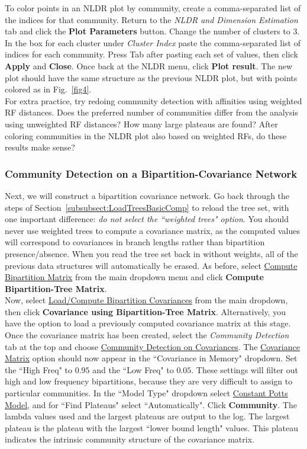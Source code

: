 \documentclass[11pt]{article}
\begin{document}
To color points in an NLDR plot by community, create a comma-separated list of the
indices for that community. Return to the {\it NLDR and Dimension Estimation} tab and click the
{\bf Plot Parameters} button. Change the number of clusters to $3$. In the box for each cluster
under {\it Cluster Index} paste the comma-separated list of indices for each community. Press Tab
after pasting each set of values, then click {\bf Apply} and {\bf Close}. Once back at the NLDR menu,
click {\bf Plot result}. The new plot should have the same structure as the previous NLDR plot,
but with points colored as in Fig.~\ref{fig4}. \\

For extra practice, try redoing community detection with affinities using weighted RF distances. Does the 
preferred number of communities differ from the analysis using unweighted RF distances? How many large
plateaus are found? After coloring communities in the NLDR plot also based on weighted RFs, do these results make sense?

\subsubsection{Community Detection on a Bipartition-Covariance Network}\label{subsubsect:CommunityDetectionBipartCovNetwork}

Next, we will construct a bipartition covariance network. Go back through the steps
of Section~\ref{subsubsect:LoadTreesBasicComp} to reload the tree set, with one important difference: {\it do not select the ``weighted trees" option}. You should never use weighted trees to compute a covariance matrix, as the computed values will correspond to covariances in branch lengths rather than bipartition presence/absence. When you read the tree set back in without weights, all of the previous
data structures will automatically be erased. As	before, select \ul{Compute Bipartition Matrix}
from	the main dropdown menu and	click	{\bf Compute Bipartition-Tree Matrix}. \\


Now, select \ul{Load/Compute Bipartition Covariances} from the main dropdown, then
click {\bf Covariance using Bipartition-Tree Matrix}. Alternatively, you have the option to load a
previously computed covariance matrix at this stage. Once the covariance matrix has been
created, select the {\it Community Detection} tab at the top and choose \ul{Community Detection on
Covariances}. The \ul{Covariance Matrix} option should now appear in the ``Covariance in
Memory" dropdown. Set the ``High Freq" to $0.95$ and the ``Low Freq" to $0.05$. These settings
will filter out high and low frequency bipartitions, because they are very difficult to assign to
particular communities. In the ``Model Type" dropdown select \ul{Constant Potts Model}, and
for ``Find Plateaus" select ``Automatically". Click {\bf Community}. The lambda values used and
the largest plateaus are output to the log. The largest plateau is the plateau with the largest
``lower bound length" values. This plateau indicates the intrinsic community structure of the
covariance matrix. \\
\end{document}
